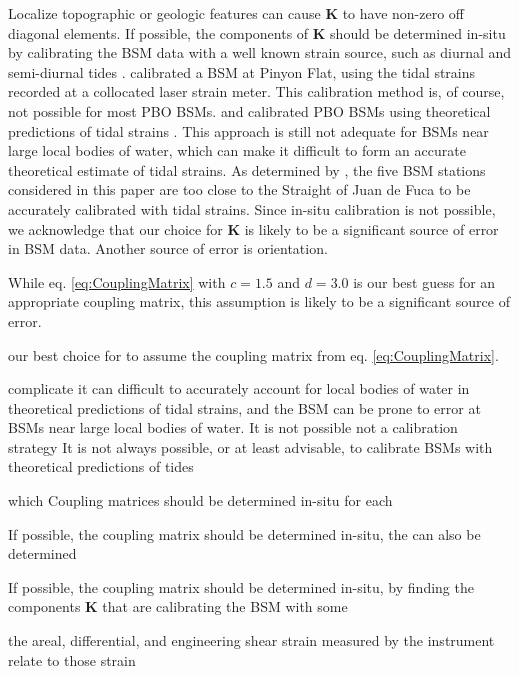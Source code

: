 \documentclass[10pt,a4paper]{article}
\begin{document}
Localize topographic or geologic features can cause $\mathbf{K}$ to have non-zero off diagonal elements. If possible, the components of $\mathbf{K}$ should be determined in-situ by calibrating the BSM data with a well known strain source, such as diurnal and semi-diurnal tides \citep{Hart1996,Roeloffs2010,Hodgkinson2013}. \citet{Hart1996} calibrated a BSM at Pinyon Flat, using the tidal strains recorded at a collocated laser strain meter. This calibration method is, of course, not possible for most PBO BSMs. \citet{Roeloffs2010} and \citet{Hodgkinson2013} calibrated PBO BSMs using theoretical predictions of tidal strains \citep[e.g.,][]{Agnew1997}. This approach is still not adequate for BSMs near large local bodies of water, which can make it difficult to form an accurate theoretical estimate of tidal strains. As determined by \citet{Roeloffs2010}, the five BSM stations considered in this paper are too close to the Straight of Juan de Fuca to be accurately calibrated with tidal strains. Since in-situ calibration is not possible, we acknowledge that our choice for $\mathbf{K}$ is likely to be a significant source of error in BSM data. Another source of error is orientation.   

While eq. \ref{eq:CouplingMatrix} with $c=1.5$ and $d=3.0$ is our best guess for an appropriate coupling matrix, this assumption is likely to be a significant source of error.

our best choice for to assume the coupling matrix from eq. \ref{eq:CouplingMatrix}.      




complicate it can difficult to accurately account for local bodies of water in theoretical predictions of tidal strains, and the BSM can be prone to error at BSMs near large local bodies of water.    It is not possible not a calibration strategy It is not always possible, or at least advisable, to calibrate BSMs with theoretical predictions of tides     


which    Coupling matrices should be determined in-situ for each 


If possible, the coupling matrix should be determined in-situ,  the can also be determined  

If possible, the coupling matrix should be determined in-situ, by finding the components $\mathbf{K}$ that are  calibrating the BSM with some  
 

 the areal, differential, and engineering shear strain measured by the instrument relate to those strain  
\end{document}
